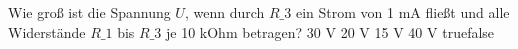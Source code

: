    {Wie groß ist die Spannung $U$, wenn durch $R\_3$ ein Strom von 1 mA fließt und alle Widerstände $R\_1$ bis $R\_3$ je 10 kOhm betragen? }
    {30 V}
    {20 V}
    {15 V}
    {40 V}
    {true}{false}